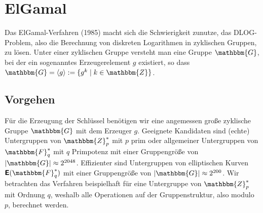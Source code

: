 \section{ElGamal}
\label{ch:asymenc:elgamal}
Das ElGamal-Verfahren (1985) macht sich die Schwierigkeit zunutze, das DLOG-Problem, also die Berechnung von diskreten Logarithmen in zyklischen Gruppen, zu lösen. Unter einer zyklischen Gruppe versteht man eine Gruppe $\mathbbm{G}$, bei der ein sogenanntes Erzeugerelement $g$ existiert, so dass $\mathbbm{G} = \langle g \rangle := \{g^k \mid k \in \mathbbm{Z}\}$.

\subsection{Vorgehen}
Für die Erzeugung der Schlüssel benötigen wir eine angemessen große zyklische Gruppe $\mathbbm{G}$ mit dem Erzeuger $g$.
Geeignete Kandidaten sind (echte) Untergruppen von $\mathbbm{Z}^*_p$ mit $p$ prim oder allgemeiner Untergruppen von $\mathbbm{F}^*_q$ mit $q$ Primpotenz mit einer Gruppengröße von $|\mathbbm{G}| \approx 2^{2048}$.
Effizienter sind Untergruppen von elliptischen Kurven $\boldsymbol{\mathsf{E}}(\mathbbm{F}^*_q)$ mit einer Gruppengröße von $|\mathbbm{G}| \approx 2^{200}$. Wir betrachten das Verfahren beispielhaft für eine Untergruppe von $\mathbbm{Z}^*_p$ mit Ordnung $q$, weshalb alle Operationen auf der Gruppenstruktur, also modulo $p$, berechnet werden.

